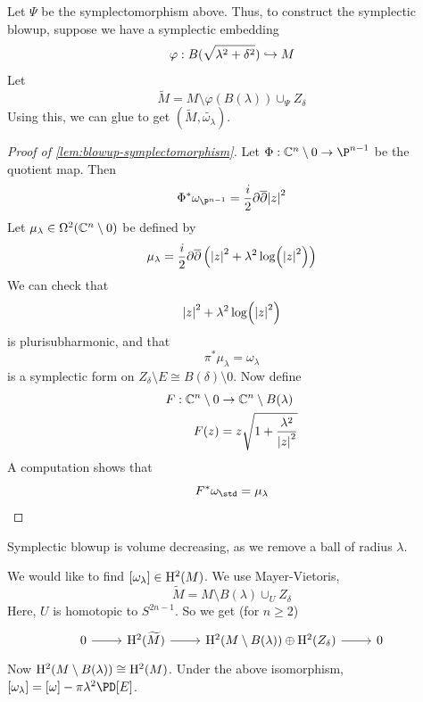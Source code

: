 \documentclass{article}
\begin{document}
Let \(\Psi\) be the symplectomorphism above. Thus, to construct the symplectic blowup, suppose we have a symplectic embedding
\[\varphi : B(\sqrt{\lambda^2 + \delta^2}) \hookrightarrow M\]
Let
\[\widetilde M = M \setminus \varphi(B(\lambda)) \cup_\Psi Z_\delta\]
Using this, we can glue to get \((\widetilde M, \widetilde{\omega_\lambda})\).

\begin{proof}
    [Proof of \cref{lem:blowup-symplectomorphism}]

    Let \(\Phi : \C^n\setminus 0 \to \P^{n-1}\) be the quotient map. Then
    \[\Phi^*\omega_{\P^{n-1}} = \frac{i}{2}\partial\overline\partial\abs{z}^2\]
    Let \(\mu_\lambda \in \Omega^2(\mathbb{C}^n \setminus 0)\) be defined by
    \[\mu_\lambda = \frac{i}{2}\partial\overline\partial\left(\abs{z}^2 + \lambda^2 \log(\abs{z}^2)\right)\]
    We can check that
    \[\abs{z}^2 + \lambda^2 \log(\abs{z}^2)\]
    is plurisubharmonic, and that
    \[\pi^*\mu_\lambda = \omega_\lambda\]
    is a symplectic form on \(Z_\delta\setminus E \cong B(\delta) \setminus 0\). Now define
    \begin{align*}
        F : \mathbb{C}^n \setminus 0 &\to \mathbb{C}^n \setminus B(\lambda) \\
        F(z) &= z\sqrt{1 + \frac{\lambda^2}{\abs{z}^2}}
    \end{align*}
    A computation shows that
    \[F^*\omega_{\std} = \mu_\lambda\]
\end{proof}

\begin{remark}
    Symplectic blowup is volume decreasing, as we remove a ball of radius \(\lambda\).
\end{remark}

We would like to find \([\omega_\lambda] \in \mathrm{H}^2(M)\). We use Mayer-Vietoris,
\[\widetilde M = M \setminus B(\lambda) \cup_{U} Z_\delta\]
Here, \(U\) is homotopic to \(S^{2n-1}\). So we get (for \(n \ge 2\))
\[\begin{tikzcd}
	0 & {\HH^2(\widetilde M)} & {\HH^2(M \setminus B(\lambda))\oplus \HH^2(Z_\delta)} & 0
	\arrow[from=1-1, to=1-2]
	\arrow[from=1-2, to=1-3]
	\arrow[from=1-3, to=1-4]
\end{tikzcd}\]
Now \(\mathrm{H}^2(M \setminus B(\lambda)) \cong \mathrm{H}^2(M)\). Under the above isomorphism, \([\omega_\lambda] = [\omega] - \pi\lambda^2\PD[E]\).
\end{document}
